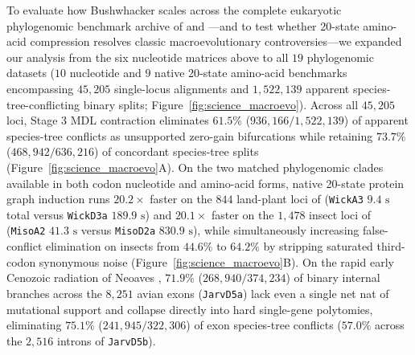 \documentclass[11pt,a4paper]{article}
\begin{document}
To evaluate how Bushwhacker scales across the complete eukaryotic phylogenomic benchmark archive of \citet{shen2017contentious} and \citet{zhou2018evaluating}---and to test whether 20-state amino-acid compression resolves classic macroevolutionary controversies---we expanded our analysis from the six nucleotide matrices above to all $19$ phylogenomic datasets ($10$ nucleotide and $9$ native 20-state amino-acid benchmarks encompassing $45,205$ single-locus alignments and $1,522,139$ apparent species-tree-conflicting binary splits; Figure~\ref{fig:science_macroevo}). Across all $45,205$ loci, Stage 3 MDL contraction eliminates $61.5\%$ ($936,166 / 1,522,139$) of apparent species-tree conflicts as unsupported zero-gain bifurcations while retaining $73.7\%$ ($468,942 / 636,216$) of concordant species-tree splits (Figure~\ref{fig:science_macroevo}A). On the two matched phylogenomic clades available in both codon nucleotide and amino-acid forms, native 20-state protein graph induction runs $20.2\times$ faster on the $844$ land-plant loci of \citet{wickett2014phylotranscriptomic} (\texttt{WickA3} $9.4\text{ s}$ total versus \texttt{WickD3a} $189.9\text{ s}$) and $20.1\times$ faster on the $1,478$ insect loci of \citet{misof2014phylogenomics} (\texttt{MisoA2} $41.3\text{ s}$ versus \texttt{MisoD2a} $830.9\text{ s}$), while simultaneously increasing false-conflict elimination on insects from $44.6\%$ to $64.2\%$ by stripping saturated third-codon synonymous noise (Figure~\ref{fig:science_macroevo}B). On the rapid early Cenozoic radiation of Neoaves \citep{jarvis2014whole,prum2015comprehensive}, $71.9\%$ ($268,940 / 374,234$) of binary internal branches across the $8,251$ avian exons (\texttt{JarvD5a}) lack even a single net nat of mutational support and collapse directly into hard single-gene polytomies, eliminating $75.1\%$ ($241,945 / 322,306$) of exon species-tree conflicts ($57.0\%$ across the $2,516$ introns of \texttt{JarvD5b}).
\end{document}
